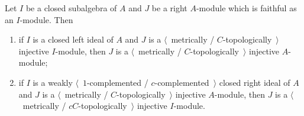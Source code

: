 \begin{proposition}\label{MetTopInjUnderChangeOfAlg} Let $I$ be a closed
subalgebra of $A$ and $J$ be a right $A$-module which is faithful as an $I$-module.
Then

\begin{enumerate}[label = (\roman*)]
    \item if $I$ is a closed left ideal of $A$ and $J$ is a $\langle$~metrically /
    $C$-topologically~$\rangle$  injective $I$-module, then $J$ is a 
    $\langle$~metrically / $C$-topologically~$\rangle$ injective $A$-module;

    \item if $I$ is a weakly $\langle$~$1$-complemented /
    $c$-complemented~$\rangle$ closed right ideal of $A$ and $J$ is a
    $\langle$~metrically / $C$-topologically~$\rangle$ injective $A$-module,
    then $J$ is a $\langle$~metrically / $cC$-topologically~$\rangle$ injective
    $I$-module.
\end{enumerate}
\end{proposition}
